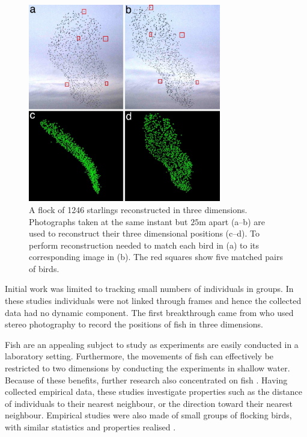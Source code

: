 \begin{figure}[t]
	\includegraphics[width=0.75\textwidth]{ballerini_starlings.jpg}
	\caption{A flock of 1246 starlings reconstructed in three dimensions. Photographs taken at the same instant but $25$m apart (a--b) are used to reconstruct their three dimensional positions (c--d). To perform reconstruction \citet{ballerini08} needed to match each bird in (a) to its corresponding image in (b). The red squares show five matched pairs of birds.}
	\label{fig:ballerini}
\end{figure}

Initial work was limited to tracking small numbers of individuals in groups. In these studies individuals were not linked through frames and hence the collected data had no dynamic component. The first breakthrough came from \citet{cullen65} who used stereo photography to record the positions of fish in three dimensions.

Fish are an appealing subject to study as experiments are easily conducted in a laboratory setting. Furthermore, the movements of fish can effectively be restricted to two dimensions by conducting the experiments in shallow water. Because of these benefits, further research also concentrated on fish \citep{partridge80, van_long85}. Having collected empirical data, these studies investigate properties such as the distance of individuals to their nearest neighbour, or the direction toward their nearest neighbour. Empirical studies were also made of small groups of flocking birds, with similar statistics and properties realised \citep{major78, budgey98}.

